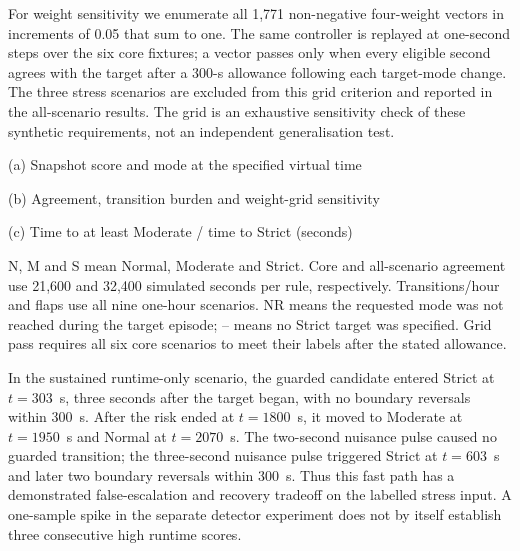 \documentclass{ieeeaccess}
\renewcommand{\textbf}[1]{#1}
\begin{document}
For weight sensitivity we enumerate all 1,771 non-negative four-weight vectors in increments of 0.05 that sum to one. The same controller is replayed at one-second steps over the six core fixtures; a vector passes only when every eligible second agrees with the target after a 300-s allowance following each target-mode change. The three stress scenarios are excluded from this grid criterion and reported in the all-scenario results. The grid is an exhaustive sensitivity check of these synthetic requirements, not an independent generalisation test.

\begin{table}[!t]
\caption{Fusion component study: nine one-hour scenarios and 1,771 weight vectors}
\label{tab:fusion_results}
\centering
\footnotesize
\textbf{(a) Snapshot score and mode at the specified virtual time}\par\smallskip


\medskip
\textbf{(b) Agreement, transition burden and weight-grid sensitivity}\par\smallskip


\medskip
\textbf{(c) Time to at least Moderate / time to Strict (seconds)}\par\smallskip


\par\smallskip
\parbox{0.95\textwidth}{\scriptsize N, M and S mean Normal, Moderate and Strict. Core and all-scenario agreement use 21,600 and 32,400 simulated seconds per rule, respectively. Transitions/hour and flaps use all nine one-hour scenarios. NR means the requested mode was not reached during the target episode; -- means no Strict target was specified. Grid pass requires all six core scenarios to meet their labels after the stated allowance.}
\end{table}

In the sustained runtime-only scenario, the guarded candidate entered Strict at $t=303$~s, three seconds after the target began, with no boundary reversals within 300~s. After the risk ended at $t=1800$~s, it moved to Moderate at $t=1950$~s and Normal at $t=2070$~s. The two-second nuisance pulse caused no guarded transition; the three-second nuisance pulse triggered Strict at $t=603$~s and later two boundary reversals within 300~s. Thus this fast path has a demonstrated false-escalation and recovery tradeoff on the labelled stress input. A one-sample spike in the separate detector experiment does not by itself establish three consecutive high runtime scores.
\end{document}
